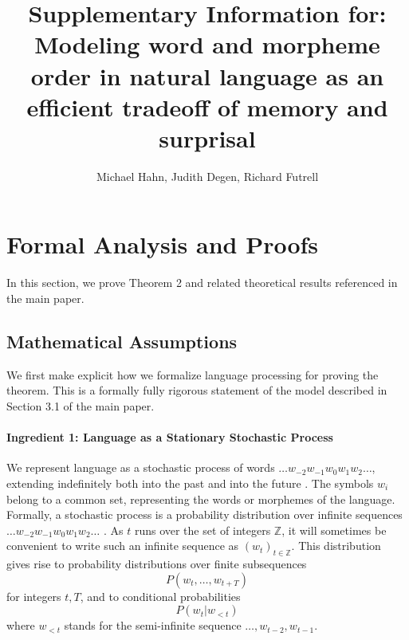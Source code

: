 \documentclass[11pt,letterpaper]{article}
\title{Supplementary Information for: Modeling word and morpheme order in natural language as an efficient tradeoff of memory and surprisal}
\author{Michael Hahn, Judith Degen, Richard Futrell}
\newcounter{theorem}
\begin{document}
\maketitle

\tableofcontents


%
%
%


\section{Formal Analysis and Proofs}

In this section, we prove Theorem 2 and related theoretical results referenced in the main paper.

\subsection{Mathematical Assumptions}

We first make explicit how we formalize language processing for proving the theorem.
This is a formally fully rigorous statement of the model described in Section 3.1 of the main paper.


\paragraph{Ingredient 1: Language as a Stationary Stochastic Process}
We represent language as a stochastic process of words $\dots w_{-2} w_{-1} w_0 w_{1} w_{2} \dots$, extending indefinitely both into the past and into the future \citep{doob1953stochastic,karlin2014first}.
The symbols $w_i$ belong to a common set, representing the words or morphemes of the language.
Formally, a stochastic process is a probability distribution over infinite sequences $\dots w_{-2} w_{-1} w_0 w_{1} w_{2} \dots$ \citep{doob1953stochastic,karlin2014first}.
As $t$ runs over the set of integers $\mathbb{Z}$, it will sometimes be convenient to write such an infinite sequence as $(w_t)_{t \in \mathbb{Z}}$.
This distribution gives rise to probability distributions over finite subsequences
\begin{equation}
	P(w_t, \dots, w_{t+T})
\end{equation}
for integers $t, T$, and to conditional probabilities
\begin{equation}
	P(w_t | w_{<t})
\end{equation}
where $w_{<t}$ stands for the semi-infinite sequence $\dots, w_{t-2}, w_{t-1}$.
\end{document}
